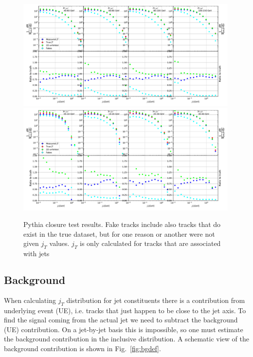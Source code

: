 \begin{figure}
\includegraphics[width=0.99\textwidth]{figures/analysis/PythiaTest.pdf}
\includegraphics[width=0.99\textwidth]{figures/analysis/PythiaTest_Extra.pdf}
\caption{Pythia closure test results. Fake tracks include also tracks that do exist in the true dataset, but for one reason or another were not given $j_T$ values. $j_T$ is only calculated for tracks that are associated with jets}
\label{fig:closure}
\end{figure}





 
\subsection{Background}
\label{sec:bg}
When calculating $j_T$ distribution for jet constituents there is a contribution from underlying event (UE), i.e. tracks that just happen to be close to the jet axis.
To find the signal coming from the actual jet we need to subtract the background (UE) contribution. On a jet-by-jet basis this is impossible, so one must estimate the background contribution in the inclusive  distribution. A schematic view of the background contribution is shown in Fig.~\ref{fig:bgdef}.

